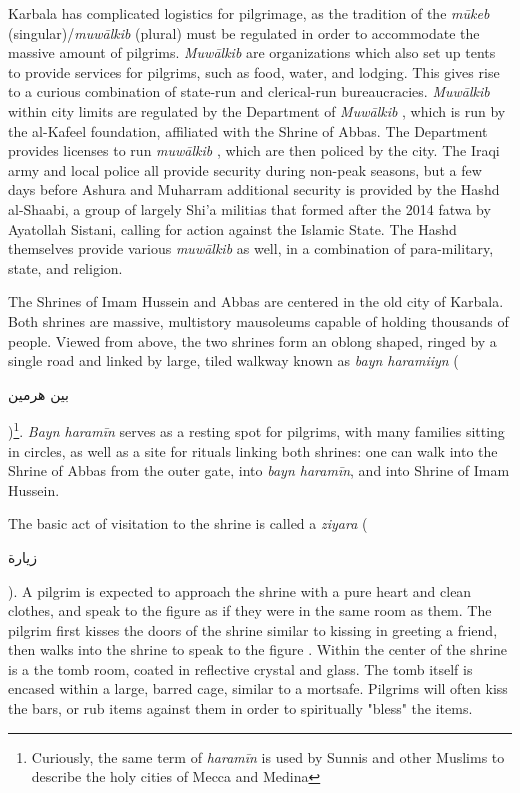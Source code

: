 Karbala has complicated logistics for pilgrimage, as the tradition of the \emph{mūkeb} (singular)/\emph{muwālkib} (plural) must be regulated in order to accommodate the massive amount of pilgrims. \emph{Muwālkib}  are organizations which also set up tents to provide services for pilgrims, such as food, water, and lodging. This gives rise to a curious combination of state-run and clerical-run bureaucracies. \emph{Muwālkib}  within city limits are regulated by the Department of \emph{Muwālkib} , which is run by the al-Kafeel foundation, affiliated with the Shrine of Abbas. The Department provides licenses to run \emph{muwālkib} , which are then policed by the city. The Iraqi army and local police all provide security during non-peak seasons, but a few days before Ashura and Muharram additional security is provided by the Hashd al-Shaabi, a group of largely Shi'a militias that formed after the 2014 fatwa by Ayatollah Sistani, calling for action against the Islamic State. The Hashd themselves provide various \emph{muwālkib}  as well, in a combination of para-military, state, and religion. 

The Shrines of Imam Hussein and Abbas are centered in the old city of Karbala. Both shrines are massive, multistory mausoleums capable of holding thousands of people. Viewed from above, the two shrines form an oblong shaped, ringed by a single road and linked by large, tiled walkway known as \emph{bayn haramiiyn} (\begin{Arabic}بين هرمين \end{Arabic})\footnote{Curiously, the same term of \emph{haramīn} is used by Sunnis and other Muslims to describe the holy cities of Mecca and Medina}. \emph{Bayn haramīn} serves as a resting spot for pilgrims, with many families sitting in circles, as well as a site for rituals linking both shrines: one can walk into the Shrine of Abbas from the outer gate, into \emph{bayn haramīn}, and into Shrine of Imam Hussein. 

The basic act of visitation to the shrine is called a \emph{ziyara} (\begin{Arabic}
    زيارة
\end{Arabic}). A pilgrim is expected to approach the shrine with a pure heart and clean clothes, and speak to the figure as if they were in the same room as them. The pilgrim first kisses the doors of the shrine similar to kissing in greeting a friend, then walks into the shrine to speak to the figure \cite{qisa_publications_illustrated_2018}. Within the center of the shrine is a the tomb room, coated in reflective crystal and glass. The tomb itself is encased within a large, barred cage, similar to a mortsafe. Pilgrims will often kiss the bars, or rub items against them in order to spiritually "bless" the items. 

